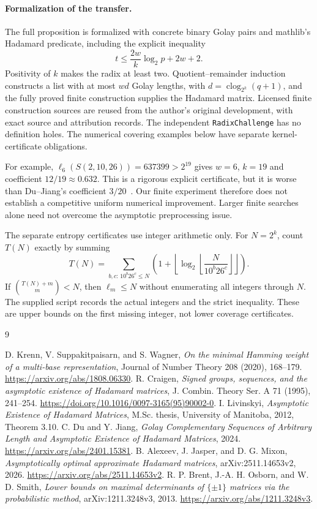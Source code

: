\paragraph{Formalization of the transfer.}
The full proposition is formalized with concrete binary Golay pairs and
mathlib's Hadamard predicate, including the explicit inequality
\[
 t\le\frac{2w}{k}\log_2p+2w+2.
\]
Positivity of $k$ makes the radix at least two. Quotient--remainder
induction constructs a list with at most $wd$ Golay lengths, with
$d=\operatorname{clog}_{2^k}(q+1)$, and the fully proved finite
construction supplies the Hadamard matrix. Licensed finite construction
sources are reused from the author's original development, with exact
source and attribution records. The independent \texttt{RadixChallenge}
has no definition holes. The numerical covering examples below have
separate kernel-certificate obligations.

For example, $\ell_6(S(2,10,26))=637399>2^{19}$ gives $w=6$, $k=19$
and coefficient $12/19\approx0.632$. This is a rigorous explicit
certificate, but it is worse than Du--Jiang's coefficient $3/20$~\cite{ext:DJ}.
Our finite experiment therefore does not establish a competitive uniform
numerical improvement. Larger finite searches alone need not overcome
the asymptotic preprocessing issue.

The separate entropy certificates use integer arithmetic only. For
$N=2^k$, count $T(N)$ exactly by summing
\[
T(N)=\sum_{b,c:\,10^b26^c\le N}
\left(1+\left\lfloor\log_2\left\lfloor
\frac{N}{10^b26^c}\right\rfloor\right\rfloor\right).
\]
If $\binom{T(N)+m}{m}<N$, then $\ell_m\le N$ without enumerating all
integers through $N$. The supplied script records the actual integers
and the strict inequality. These are upper bounds on the first missing
integer, not lower coverage certificates.

\begin{thebibliography}{9}
\raggedright
{} D. Krenn, V. Suppakitpaisarn, and S. Wagner,
\emph{On the minimal Hamming weight of a multi-base representation},
Journal of Number Theory 208 (2020), 168--179.
\url{https://arxiv.org/abs/1808.06330}.
 R. Craigen, \emph{Signed groups, sequences, and the
asymptotic existence of Hadamard matrices}, J. Combin. Theory Ser. A
71 (1995), 241--254. \url{https://doi.org/10.1016/0097-3165(95)90002-0}.
 I. Livinskyi, \emph{Asymptotic Existence of Hadamard
Matrices}, M.Sc. thesis, University of Manitoba, 2012, Theorem 3.10.
 C. Du and Y. Jiang, \emph{Golay Complementary Sequences of
Arbitrary Length and Asymptotic Existence of Hadamard Matrices}, 2024.
\url{https://arxiv.org/abs/2401.15381}.
 B. Alexeev, J. Jasper, and D. G. Mixon,
\emph{Asymptotically optimal approximate Hadamard matrices},
arXiv:2511.14653v2, 2026. \url{https://arxiv.org/abs/2511.14653v2}.
 R. P. Brent, J.-A. H. Osborn, and W. D. Smith,
\emph{Lower bounds on maximal determinants of $\{\pm1\}$ matrices via
the probabilistic method}, arXiv:1211.3248v3, 2013.
\url{https://arxiv.org/abs/1211.3248v3}.
\end{thebibliography}
